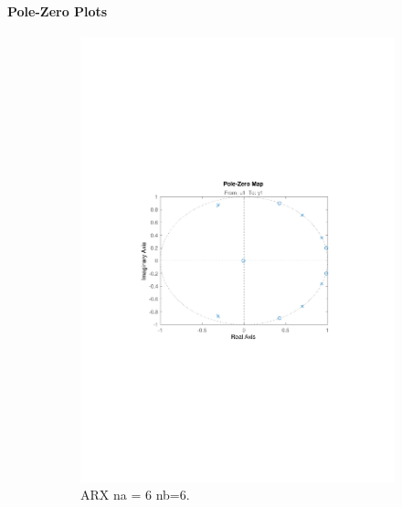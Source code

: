 \documentclass[]{article}
\begin{document}
\paragraph{Pole-Zero Plots}
\begin{figure}[ht]
\centering
\begin{subfigure}{.49\textwidth}
	\centering
	\includegraphics[trim= 10cm 8cm 10cm 8cm, scale=0.4]{figures/pz_arx_66.pdf}
	\caption{ARX na = 6 nb=6.}
	\label{fig:pzplot_arx1}
\end{subfigure}
\begin{subfigure}{.49\textwidth}
	\centering

\end{subfigure}
\end{figure}
\end{document}
